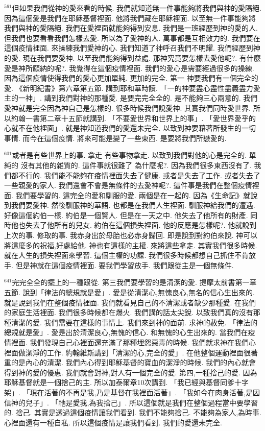 \documentclass{book}
\begin{document}
$^{561}$但如果我們從神的愛來看的時候.
我們就知道無一件事能夠將我們與神的愛隔絕.
因為這個愛是我們在耶穌基督裡面.
他將我們藏在耶穌裡面.
以至無一件事能夠將我們與神的愛隔絕.
我們在愛裡面就能夠得到安息.
我們是一班經歷到神的愛的人.
但我們也要看看我們怎樣去愛.
所以為了愛神的人.
萬事都是互相效力的.
我們要在這個疫情裡面.
來操練我們愛神的心.
我們知道了神呼召我們不明耀.
我們經歷到神的愛.
現在我們要愛神.
以至我們能夠得到益處.
那神究竟要怎樣去愛他呢?.
有什麼愛是神所願納的呢?.
我覺得在這個疫情裡面.
我們的愛心是需要經過很多的操練.
因為這個疫情使得我們的愛心更加單純.
更加的完全.
第一 神要我們有一個完全的愛.
《新明紀書》第六章第五節.
講到耶和華時讀.
「一的神要盡心盡性盡義盡力愛主的一神」.
講到我們對神的那種愛.
是要完完全全的.
是不能夠三心兩意的.
我們愛神就是完全因為神自己是怎樣的.
很多時候我們說愛神.
其實我們同時愛世界.
所以約翰一書第二章十五節就講到.
「不要愛世界和世界上的事」.
「愛世界愛乎的心就不在他裡面」.
就是神知道我們的愛還未完全.
以致到神要藉著所發生的一切事情.
而今在這個疫情.
將來可能是變了一些東西.
是要將我們所戀愛的.

$^{601}$或者是有些世界上的事.
拿走 有些事物拿走.
以致到我們對他的心是完全的.
單純的 沒有其他的雜質的.
這件事就很難了 為什麼呢?.
因為我們很多東西沒有了.
我們都不行的.
我們能不能夠在疫情裡面失去了健康.
或者是失去了工作.
或者失去了一些親愛的家人.
我們還會不會是無條件的去愛神呢?.
這件事是我們在整個疫情裡面.
我們要學習的.
這完全的愛和馴服的愛.
兩個是在一起的.
因為《生命記》就說到我們要愛神.
然後馴服神的華語.
也都是在我們人生裡面.
馴服神給我們的遭遇.
好像這個約伯一樣.
約伯是一個賢人.
但是在一天之中.
他失去了他所有的財產.
同時他也失去了他所有的兒女.
約伯在這個損失裡面.
他的反應是怎樣呢?.
他就說到上次的事.
修取的事.
我赤身出於母胎也必赤身歸回.
即是說到對約伯來說.
神可以將這麼多的祝福,好處給他.
神也有這樣的主權.
來將這些拿走.
其實我們很多時候.
就在人生的損失裡面來學習.
這個主權的功課.
我們很多時候都想自己抓住不肯放手.
但是神就在這個疫情裡面.
要我們學習放手.
我們跟從主是一個無條件.

$^{641}$完完全全的擺上的一種跟從.
第三我們要學習的是清潔的愛.
提摩太前書第一章五節.
說到「律法的總規就是愛」.
愛是從清潔心,無愧良心,無名的信心生出來的.
就是說到我們在整個疫情裡面.
我們就看見自己的不清潔或者缺少那種愛.
在我們的家庭生活裡面.
我們很多時候都在爆火.
我們講的話太尖銳.
以致我們真的沒有那種清潔的愛.
我們需要在這樣的事情上.
我們來到神的面前.
求神的赦免.
「律法的總規就是愛」.
愛是出於清潔良心,無愧的信心.
和無愧的心生出來的.
當我們在疫情裡面.
我們發現自己心裡面還充滿了那種埋怨惡毒的時候.
我們就求神在我們心裡面做潔淨的工作.
約翰維斯講到「清潔的心,完全的愛」.
在他整個運動裡面很著重的是內心的清潔.
我們內心得到耶穌基督的寶血的潔淨的時候.
我們的內心就會得到神的愛的優惠.
我們就會對神,對人有一個完全的愛.
第四,一種捨己的愛.
因為耶穌基督就是一個捨己的主.
所以加泰爾章10次講到.
「我已經與基督同爹十字架」.
「現在活著的不再是我,乃是基督在我裡面活著」.
「我如今在肉身活著,是因信神的兒子」.
「祂是愛我,為我捨己」.
所以這個就是我們在整個過程當中要學習的.
捨己.
其實是透過這個疫情讓我們看到.
我們不能夠捨己.
不能夠為家人,為時事.
心裡面還有一種自私.
所以這個疫情是讓我們看到.
我們的愛還未完全.
\end{document}
